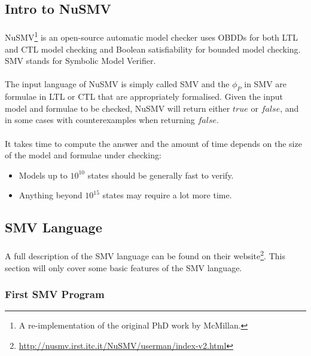 \documentclass{article}
\theoremstyle{plain}
\theoremstyle{definition}
\begin{document}
\begin{multicols}{2}
\subsection{Intro to NuSMV}

\paragraph{} NuSMV\footnote{A re-implementation of the original PhD work by McMillan.} is an open-source automatic model checker uses OBDDs for both LTL and CTL model checking and Boolean satisfiability for bounded model checking. SMV stands for Symbolic Model Verifier.

\paragraph{} The input language of NuSMV is simply called SMV and the $\phi_P$ in SMV are formulae in LTL or CTL that are appropriately formalised. Given the input model and formulae to be checked, NuSMV will return either $true$ or $false$, and in some cases with counterexamples when returning $false$.

\paragraph{} It takes time to compute the answer and the amount of time depends on the size of the model and formulae under checking:

\begin{itemize}
\item Models up to $10^{10}$ states should be generally fast to verify.
\item Anything beyond $10^{15}$ states may require a lot more time.
\end{itemize}

\subsection{SMV Language}

\paragraph{} A full description of the SMV language can be found on their website\footnote{\url{http://nusmv.irst.itc.it/NuSMV/userman/index-v2.html}}. This section will only cover some basic features of the SMV language.

\subsubsection{First SMV Program}


\end{multicols}
\end{document}
